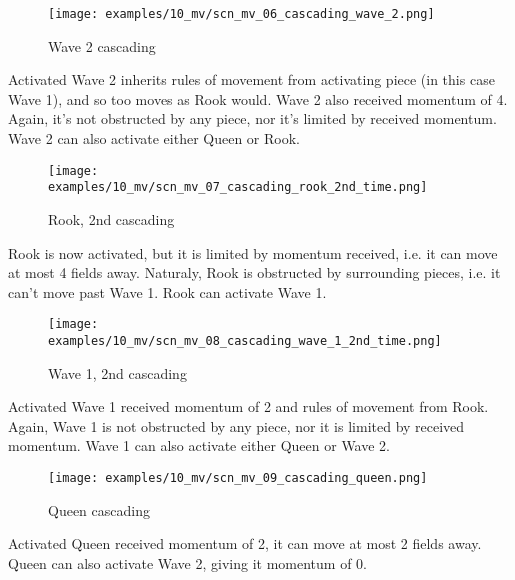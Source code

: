 \clearpage %

\noindent
\begin{wrapfigure}[13]{l}{0.5625\textwidth}
\centering
\texttt{[image: examples/10\_mv/scn\_mv\_06\_cascading\_wave\_2.png]}
\caption{Wave 2 cascading}
\label{fig:scn_mv_06_cascading_wave_2}
\end{wrapfigure}
Activated Wave 2 inherits rules of movement from activating piece (in this
case Wave 1), and so too moves as Rook would. Wave 2 also received momentum
of 4. Again, it's not obstructed by any piece, nor it's limited by received
momentum. Wave 2 can also activate either Queen or Rook.

\vspace*{0.075\textheight}
\noindent
\begin{wrapfigure}[9]{r}{0.5625\textwidth}
\centering
\texttt{[image: examples/10\_mv/scn\_mv\_07\_cascading\_rook\_2nd\_time.png]}
\caption{Rook, 2nd cascading}
\label{fig:scn_mv_07_cascading_rook_2nd_time}
\end{wrapfigure}
Rook is now activated, but it is limited by momentum received, i.e. it can
move at most 4 fields away. Naturaly, Rook is obstructed by surrounding pieces,
i.e. it can't move past Wave 1. Rook can activate Wave 1.

\clearpage %

\noindent
\begin{wrapfigure}[10]{l}{0.5625\textwidth}
\centering
\texttt{[image: examples/10\_mv/scn\_mv\_08\_cascading\_wave\_1\_2nd\_time.png]}
\caption{Wave 1, 2nd cascading}
\label{fig:scn_mv_08_cascading_wave_1_2nd_time}
\end{wrapfigure}
Activated Wave 1 received momentum of 2 and rules of movement from Rook. Again,
Wave 1 is not obstructed by any piece, nor it is limited by received momentum.
Wave 1 can also activate either Queen or Wave 2.

\vspace*{0.155\textheight}
\noindent
\begin{wrapfigure}[10]{r}{0.5625\textwidth}
\centering
\texttt{[image: examples/10\_mv/scn\_mv\_09\_cascading\_queen.png]}
\caption{Queen cascading}
\label{fig:scn_mv_09_cascading_queen}
\end{wrapfigure}
Activated Queen received momentum of 2, it can move at most 2 fields away.
Queen can also activate Wave 2, giving it momentum of 0.

